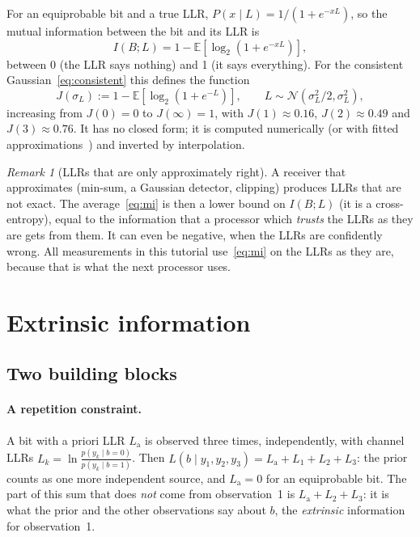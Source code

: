 \documentclass[11pt,a4paper]{article}
\newcommand{\E}{\mathbb{E}}
\newcommand{\La}{L_{\mathrm{a}}}
\newcommand{\N}{\mathcal{N}}
\theoremstyle{definition}
\theoremstyle{remark}
\newtheorem*{remark}{Remark}
\begin{document}
For an equiprobable bit and a true LLR, $P(x\mid L) = 1/(1+e^{-xL})$, so the mutual information between the bit and its LLR is
\begin{equation}
  I(B;L) = 1 - \E\!\left[\log_2\!\left(1+e^{-xL}\right)\right],
  \label{eq:mi}
\end{equation}
between 0 (the LLR says nothing) and 1 (it says everything). For the consistent Gaussian~\eqref{eq:consistent} this defines the function
\begin{equation}
  J(\sigma_L) := 1 - \E\!\left[\log_2\!\left(1+e^{-L}\right)\right],\qquad L\sim\N(\sigma_L^2/2,\sigma_L^2),
  \label{eq:J}
\end{equation}
increasing from $J(0)=0$ to $J(\infty)=1$, with $J(1)\approx 0.16$, $J(2)\approx 0.49$ and $J(3)\approx 0.76$. It has no closed form; it is computed numerically (or with fitted approximations~\cite{brannstrom}) and inverted by interpolation.

\begin{remark}[LLRs that are only approximately right]
A receiver that approximates (min-sum, a Gaussian detector, clipping) produces LLRs that are not exact. The average~\eqref{eq:mi} is then a lower bound on $I(B;L)$ (it is a cross-entropy), equal to the information that a processor which \emph{trusts} the LLRs as they are gets from them. It can even be negative, when the LLRs are confidently wrong. All measurements in this tutorial use~\eqref{eq:mi} on the LLRs as they are, because that is what the next processor uses.
\end{remark}

\section{Extrinsic information}
\label{sec:extrinsic}

\subsection{Two building blocks}

\paragraph{A repetition constraint.} A bit with a priori LLR $\La$ is observed three times, independently, with channel LLRs $L_k = \ln\frac{p(y_k\mid b=0)}{p(y_k\mid b=1)}$. Then $L(b\mid y_1,y_2,y_3) = \La + L_1+L_2+L_3$: the prior counts as one more independent source, and $\La = 0$ for an equiprobable bit. The part of this sum that does \emph{not} come from observation~1 is $\La + L_2+L_3$: it is what the prior and the other observations say about $b$, the \emph{extrinsic} information for observation~1.
\end{document}
